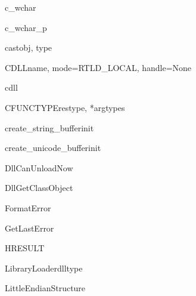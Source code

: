 \begin{classdesc}{c_wchar}{}
\end{classdesc}

\begin{classdesc}{c_wchar_p}{}
\end{classdesc}

\begin{funcdesc}{cast}{obj, type}
\end{funcdesc}

\begin{classdesc}{CDLL}{name, mode=RTLD_LOCAL, handle=None}
\end{classdesc}

\begin{datadesc}{cdll}
\end{datadesc}

\begin{funcdesc}{CFUNCTYPE}{restype, *argtypes}
\end{funcdesc}

\begin{funcdesc}{create_string_buffer}{init}
\end{funcdesc}

\begin{funcdesc}{create_unicode_buffer}{init}
\end{funcdesc}

\begin{funcdesc}{DllCanUnloadNow}{}
\end{funcdesc}

\begin{funcdesc}{DllGetClassObject}{}
\end{funcdesc}

\begin{funcdesc}{FormatError}{}
\end{funcdesc}

\begin{funcdesc}{GetLastError}{}
\end{funcdesc}

\begin{classdesc}{HRESULT}{}
\end{classdesc}

\begin{classdesc}{LibraryLoader}{dlltype}
\end{classdesc}

\begin{classdesc}{LittleEndianStructure}{}
\end{classdesc}

